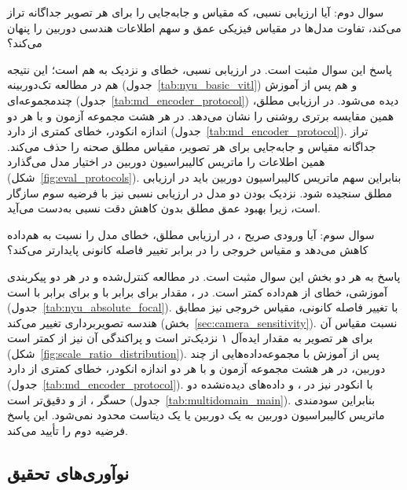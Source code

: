 سوال دوم: آیا ارزیابی نسبی، که مقیاس و جابه‌جایی را برای هر تصویر جداگانه تراز می‌کند، تفاوت مدل‌ها در مقیاس فیزیکی عمق و سهم اطلاعات هندسی دوربین را پنهان می‌کند؟

پاسخ این سوال مثبت است. در ارزیابی نسبی، خطای \proposedmodel{} و \controlmodel{} نزدیک به هم است؛ این نتیجه هم در مطالعه تک‌دوربینه  (جدول~\ref{tab:nyu_basic_vitl}) و هم پس از آموزش چندمجموعه‌ای (جدول~\ref{tab:md_encoder_protocol}) دیده می‌شود. در ارزیابی مطلق، همین مقایسه برتری روشنی را نشان می‌دهد. \proposedmodel{} در هر هشت مجموعه آزمون و با هر دو اندازه انکودر، خطای کمتری از \controlmodel{} دارد (جدول~\ref{tab:md_encoder_protocol}). تراز جداگانه مقیاس و جابه‌جایی برای هر تصویر، مقیاس مطلق صحنه را حذف می‌کند. همین اطلاعات را ماتریس کالیبراسیون دوربین در اختیار مدل می‌گذارد (شکل~\ref{fig:eval_protocols}). بنابراین سهم ماتریس کالیبراسیون دوربین باید در ارزیابی مطلق سنجیده شود. نزدیک بودن دو مدل در ارزیابی نسبی نیز با فرضیه سوم سازگار است، زیرا بهبود عمق مطلق بدون کاهش دقت نسبی به‌دست می‌آید.

سوال سوم: آیا ورودی صریح \calibrationmatrix{}، در ارزیابی مطلق، خطای مدل را نسبت به \controlmodel{} هم‌داده کاهش می‌دهد و مقیاس خروجی را در برابر تغییر فاصله کانونی پایدارتر می‌کند؟

پاسخ به هر دو بخش این سوال مثبت است. در مطالعه کنترل‌شده  و در هر دو پیکربندی آموزشی، خطای \proposedmodel{} از \controlmodel{} هم‌داده کمتر است. در \focaljitterconfig{}، مقدار  برای \proposedmodel{} برابر با  و برای \controlmodel{} برابر با  است (جدول~\ref{tab:nyu_absolute_focal}). با تغییر فاصله کانونی، مقیاس خروجی \proposedmodel{} نیز مطابق هندسه تصویربرداری تغییر می‌کند (بخش~\ref{sec:camera_sensitivity}). نسبت مقیاس آن برای هر تصویر به مقدار ایده‌آل ۱ نزدیک‌تر است و پراکندگی آن نیز از \controlmodel{} کمتر است (شکل~\ref{fig:scale_ratio_distribution}). پس از آموزش با مجموعه‌داده‌هایی از چند دوربین، \proposedmodel{} در هر هشت مجموعه آزمون و با هر دو اندازه انکودر، خطای کمتری از \controlmodel{} دارد (جدول~\ref{tab:md_encoder_protocol}). با انکودر  نیز در ،  و داده‌های دیده‌نشده دو حسگر ، از \controlmodel{} و \publishedbasemodel{} دقیق‌تر است (جدول~\ref{tab:multidomain_main}). بنابراین سودمندی ماتریس کالیبراسیون دوربین به یک دوربین یا یک دیتاست محدود نمی‌شود. این پاسخ فرضیه دوم را تأیید می‌کند.

\subsection{نوآوری‌های تحقیق}
\label{sec:chapter5_novelty}

